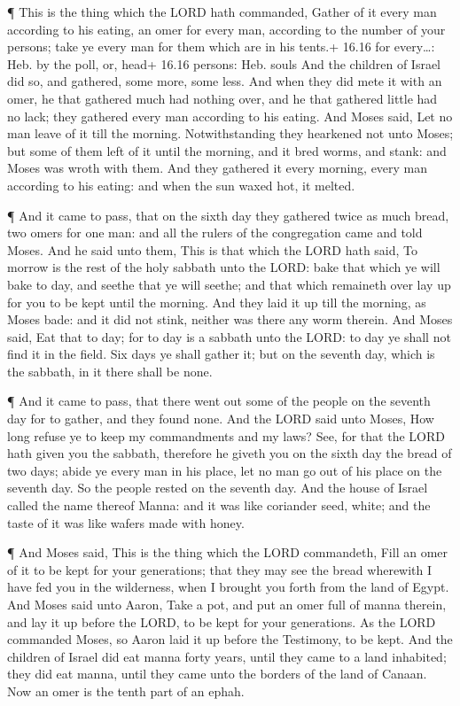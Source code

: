  ¶ This is the thing which the LORD hath commanded, Gather
of it every man according to his eating, an omer for every man,
according to the number of your persons; take ye every man for them
which are in his tents.+ 16.16 for every\ldots: Heb. by the poll, or,
head+ 16.16 persons: Heb. souls  And the children of Israel
did so, and gathered, some more, some less.  And when they
did mete it with an omer, he that gathered much had nothing over, and he
that gathered little had no lack; they gathered every man according to
his eating.  And Moses said, Let no man leave of it till
the morning.  Notwithstanding they hearkened not unto
Moses; but some of them left of it until the morning, and it bred worms,
and stank: and Moses was wroth with them.  And they
gathered it every morning, every man according to his eating: and when
the sun waxed hot, it melted.

 ¶ And it came to pass, that on the sixth day they gathered
twice as much bread, two omers for one man: and all the rulers of the
congregation came and told Moses.  And he said unto them,
This is that which the LORD hath said, To morrow is the rest of the holy
sabbath unto the LORD: bake that which ye will bake to day, and seethe
that ye will seethe; and that which remaineth over lay up for you to be
kept until the morning.  And they laid it up till the
morning, as Moses bade: and it did not stink, neither was there any worm
therein.  And Moses said, Eat that to day; for to day is a
sabbath unto the LORD: to day ye shall not find it in the field.
 Six days ye shall gather it; but on the seventh day, which
is the sabbath, in it there shall be none.

 ¶ And it came to pass, that there went out some of the
people on the seventh day for to gather, and they found none.
 And the LORD said unto Moses, How long refuse ye to keep
my commandments and my laws?  See, for that the LORD hath
given you the sabbath, therefore he giveth you on the sixth day the
bread of two days; abide ye every man in his place, let no man go out of
his place on the seventh day.  So the people rested on the
seventh day.  And the house of Israel called the name
thereof Manna: and it was like coriander seed, white; and the taste of
it was like wafers made with honey.

 ¶ And Moses said, This is the thing which the LORD
commandeth, Fill an omer of it to be kept for your generations; that
they may see the bread wherewith I have fed you in the wilderness, when
I brought you forth from the land of Egypt.  And Moses said
unto Aaron, Take a pot, and put an omer full of manna therein, and lay
it up before the LORD, to be kept for your generations.  As
the LORD commanded Moses, so Aaron laid it up before the Testimony, to
be kept.  And the children of Israel did eat manna forty
years, until they came to a land inhabited; they did eat manna, until
they came unto the borders of the land of Canaan.  Now an
omer is the tenth part of an ephah.

